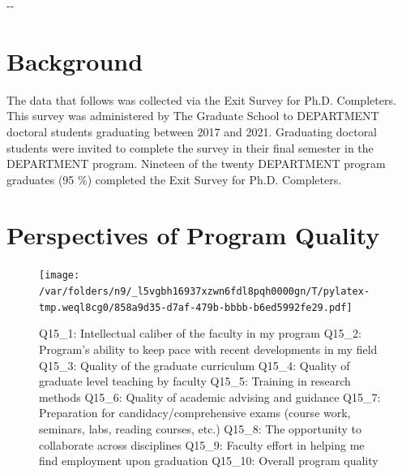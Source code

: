 \documentclass{article}%
\newenvironment{fullwidth}{ %
	\begin{adjustwidth}{}{\dimexpr-\marginparwidth-\marginparsep\relax} %
}{
	\end{adjustwidth}
}
\newenvironment{twothirdswidth}{ %
	\begin{adjustwidth}{}{\dimexpr-0.5\marginparwidth-0.5\marginparsep\relax} %
}{
	\end{adjustwidth}
}
\begin{document}
\newpage


\begin{twothirdswidth} %
	\tableofcontents %
\end{twothirdswidth}

\newpage



%
\begin{fullwidth}%
\section{Background}%
\label{sec:Background}%
The data that follows was collected via the Exit Survey for Ph.D. Completers. This survey was administered by The Graduate School to DEPARTMENT doctoral students graduating between 2017 and 2021.  Graduating doctoral students were invited to complete the survey in their final semester in the DEPARTMENT program.  Nineteen of the twenty DEPARTMENT program graduates (95 \%) completed the Exit Survey for Ph.D. Completers.

%
\end{fullwidth}%
\section{Perspectives of Program Quality}%
\label{sec:PerspectivesofProgramQuality}%


\begin{figure}[H]%
\centering%
\texttt{[image: /var/folders/n9/\_l5vgbh16937xzwn6fdl8pqh0000gn/T/pylatex-tmp.weql8cg0/858a9d35-d7af-479b-bbbb-b6ed5992fe29.pdf]}%
\caption{\newline%
Q15\_1: Intellectual caliber of the faculty in my program\newline%
Q15\_2: Program's ability to keep pace with recent developments in my field\newline%
Q15\_3: Quality of the graduate curriculum\newline%
Q15\_4: Quality of graduate level teaching by faculty\newline%
Q15\_5: Training in research methods\newline%
Q15\_6: Quality of academic advising and guidance\newline%
Q15\_7: Preparation for candidacy/comprehensive exams (course work, seminars, labs, reading courses, etc.)\newline%
Q15\_8: The opportunity to collaborate across disciplines\newline%
Q15\_9: Faculty effort in helping me find employment upon graduation\newline%
Q15\_10: Overall program quality}%
\end{figure}
\end{document}
